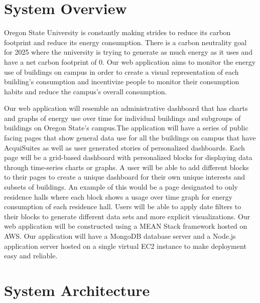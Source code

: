 \documentclass[journal,10pt,onecolumn,compsoc]{IEEEtran}
\begin{document}
    \section{System Overview} 
    Oregon State University is constantly making strides to reduce its carbon footprint and reduce its energy consumption. There is a carbon neutrality goal for 2025 where the university is trying to generate as much energy as it uses and have a net carbon footprint of 0. Our web application aims to monitor the energy use of buildings on campus in order to create a visual representation of each building's consumption and incentivize people to monitor their consumption habits and reduce the campus's overall consumption.

    \noindent Our web application will resemble an administrative dashboard that has charts and graphs of energy use over time for individual buildings and subgroups of buildings on Oregon State's campus.The application will have a series of public facing pages that show general data use for all the buildings on campus that have AcquiSuites as well as user generated stories of personalized dashboards. Each page will be a grid-based dashboard with personalized blocks for displaying data through time-series charts or graphs. A user will be able to add different blocks to their pages to create a unique dashboard for their own unique interests and subsets of buildings. An example of this would be a page designated to only residence halls where each block shows a usage over time graph for energy consumption of each residence hall. Users will be able to apply date filters to their blocks to generate different data sets and more explicit visualizations. 
    \noindent Our web application will be constructed using a MEAN Stack framework hosted on AWS. Our application will have a MongoDB database server and a Node.js application server hosted on a single virtual EC2 instance to make deployment easy and reliable.
    \section{System Architecture}
\end{document}

